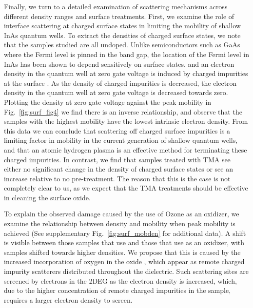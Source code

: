 Finally, we turn to a detailed examination of scattering mechanisms across different density ranges and surface treatments. First, we examine the role of interface scattering at charged surface states in limiting the mobility of shallow InAs quantum wells. To extract the densities of charged surface states, we note that the samples studied are all undoped. Unlike semiconductors such as GaAs where the Fermi level is pinned in the band gap, the location of the Fermi level in InAs has been shown to depend sensitively on surface states, and an electron density in the quantum well at zero gate voltage is induced by charged impurities at the surface \cite{PhysRevLett.66.2243,Affentauschegg_2001}. As the density of charged impurities is decreased, the electron density in the quantum well at zero gate voltage is decreased towards zero. Plotting the density at zero gate voltage against the peak mobility in Fig.~\ref{fig:surf_fig4} we find there is an inverse relationship, and observe that the samples with the highest mobility have the lowest intrinsic electron density. From this data we can conclude that scattering off charged surface impurities is a limiting factor in mobility in the current generation of shallow quantum wells, and that an atomic hydrogen plasma is an effective method for terminating these charged impurities. In contrast, we find that samples treated with TMA see either no significant change in the density of charged surface states or see an increase relative to no pre-treatment. The reason that this is the case is not completely clear to us, as we expect that the TMA treatments should be effective in cleaning the surface oxide.

To explain the observed damage caused by the use of Ozone as an oxidizer, we examine the relationship between density and mobility when peak mobility is achieved (See supplementary Fig.~\ref{fig:surf_mobden} for additional data). A shift is visible between those samples that use  and those that use  as an oxidizer, with  samples shifted towards higher densities. We propose that this is caused by the increased incorporation of oxygen in the oxide \cite{10.1021/cm0608903}, which appear as remote charged impurity scatterers \cite{scattering} distributed throughout the dielectric. Such scattering sites are screened by electrons in the 2DEG as the electron density is increased, which, due to the higher concentration of remote charged impurities in the sample, requires a larger electron density to screen.

